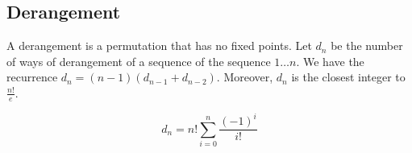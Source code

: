 \subsection{Derangement} A derangement is a permutation that has no fixed points. Let $d_n$ be the number of ways of derangement of a sequence of the sequence $1\dots n$. We have the recurrence $d_n=(n-1)(d_{n-1}+d_{n-2})$. Moreover, $d_n$ is the closest integer to $\frac{n!}{e}$.

$$d_n = n!\sum_{i=0}^{n}\frac{(-1)^i}{i!}$$
